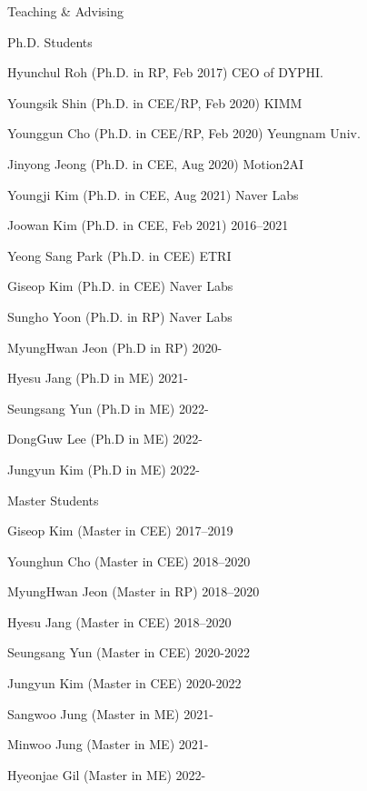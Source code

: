 \begin{rSection}{Teaching \& Advising}
\begin{rSubsection}{Ph.D. Students}{}{}{}
  \item Hyunchul Roh (Ph.D. in \acf{RP}, Feb 2017) \hfill CEO of DYPHI.
  \item Youngsik Shin (Ph.D. in \ac{CEE}/\ac{RP}, Feb 2020) \hfill KIMM
  \item Younggun Cho (Ph.D. in \ac{CEE}/\ac{RP}, Feb 2020) \hfill Yeungnam Univ.
  \item Jinyong Jeong (Ph.D. in \ac{CEE}, Aug 2020) \hfill Motion2AI
  \item Youngji Kim (Ph.D. in \ac{CEE}, Aug 2021) \hfill Naver Labs
  \item Joowan Kim (Ph.D. in \ac{CEE}, Feb 2021) \hfill 2016--2021
  \item Yeong Sang Park (Ph.D. in \ac{CEE}) \hfill ETRI
  \item Giseop Kim (Ph.D. in \ac{CEE}) \hfill Naver Labs
  \item Sungho Yoon (Ph.D. in \ac{RP}) \hfill Naver Labs
  \item MyungHwan Jeon (Ph.D in \ac{RP}) \hfill 2020-
  \item Hyesu Jang (Ph.D in \ac{ME}) \hfill 2021-
  \item Seungsang Yun (Ph.D in \ac{ME}) \hfill 2022-
  \item DongGuw Lee (Ph.D in \ac{ME}) \hfill 2022-
  \item Jungyun Kim (Ph.D in \ac{ME}) \hfill 2022-
\end{rSubsection}

\begin{rSubsection}{Master Students}{}{}{}
  \item Giseop Kim (Master in \ac{CEE}) \hfill 2017--2019
  \item Younghun Cho (Master in \ac{CEE}) \hfill 2018--2020
  \item MyungHwan Jeon (Master in \ac{RP}) \hfill 2018--2020
  \item Hyesu Jang (Master in \ac{CEE}) \hfill 2018--2020
  \item Seungsang Yun (Master in \ac{CEE}) \hfill 2020-2022
  \item Jungyun Kim (Master in \ac{CEE}) \hfill 2020-2022
  \item Sangwoo Jung (Master in \ac{ME}) \hfill 2021-
  \item Minwoo Jung (Master in \ac{ME}) \hfill 2021-
  \item Hyeonjae Gil (Master in \ac{ME}) \hfill 2022-
\end{rSubsection}


\end{rSection}
